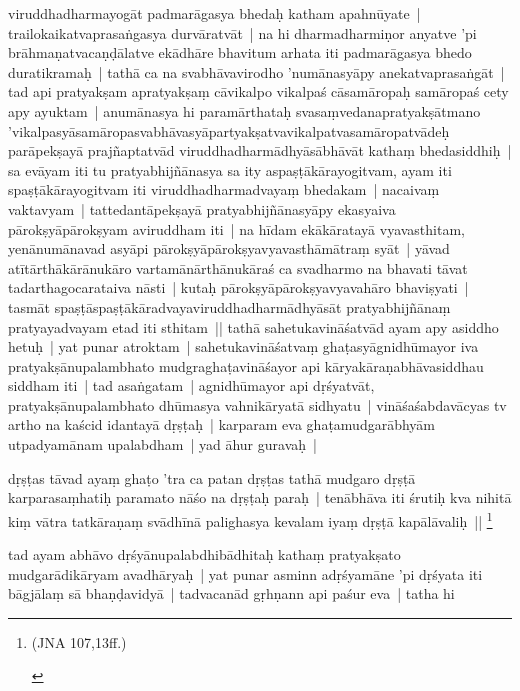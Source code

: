 \documentclass[article,a4paper]{memoir}
\begin{document}
viruddhadharmayogā\-t padmarā\-gasya bhedaḥ katham apahnū\-yate | trailokaikatvaprasaṅgasya durvā\-ratvā\-t | na hi dharmadharmiṇor anyatve 'pi brā\-hmaṇatvacaṇḍā\-latve ekā\-dhā\-re bhavitum arhata iti padmarā\-gasya bhedo duratikramaḥ | \label{thakur75-118.7} tathā\- ca na svabhā\-vavirodho 'numā\-nasyā\-py anekatvaprasaṅgā\-t | tad api pratyakṣam apratyakṣaṃ cā\-vikalpo vikalpaś cā\-samā\-ropaḥ samā\-ropaś cety apy ayuktam | anumā\-nasya hi paramā\-rthataḥ svasaṃvedanapratyakṣā\-tmano 'vikalpasyā\-samā\-ropasvabhā\-vasyā\-partyakṣatvavikalpatvasamā\-ropatvā\-deḥ parā\-pekṣayā\- prajñaptatvā\-d viruddhadharmā\-dhyā\-sā\-bhā\-vā\-t kathaṃ bhedasiddhiḥ | sa evā\-yam iti tu pratyabhijñā\-nasya sa ity aspaṣṭā\-kā\-rayogitvam, ayam iti spaṣṭā\-kā\-rayogitvam iti viruddhadharmadvayaṃ bhedakam | \label{thakur75-118.13} nacaivaṃ vaktavyam | tattedantā\-pekṣayā\- pratyabhijñā\-nasyā\-py ekasyaiva pā\-rokṣyā\-pā\-rokṣyam aviruddham iti | na hī\-dam ekā\-kā\-ratayā\- vyavasthitam, yenā\-numā\-navad asyā\-pi pā\-rokṣyā\-pā\-rokṣyavyavasthā\-mā\-traṃ syā\-t | yā\-vad atī\-tā\-rthā\-kā\-rā\-nukā\-ro vartamā\-nā\-rthā\-nukā\-raś ca svadharmo na bhavati tā\-vat tadarthagocarataiva nā\-sti | kutaḥ pā\-rokṣyā\-pā\-rokṣyavyavahā\-ro bhaviṣyati | tasmā\-t spaṣṭā\-spaṣṭā\-kā\-radvayaviruddhadharmā\-dhyā\-sā\-t pratyabhijñā\-naṃ pratyayadvayam etad iti sthitam || \label{thakur75-118.19} tathā\- sahetukavinā\-śatvā\-d ayam apy asiddho hetuḥ | yat punar atroktam | sahetukavinā\-śatvaṃ ghaṭasyā\-gnidhū\-mayor iva pratyakṣā\-nupalambhato mudgraghaṭavinā\-śayor api kā\-ryakā\-raṇabhā\-vasiddhau siddham iti | tad asaṅgatam | agnidhū\-mayor api dṛśyatvā\-t, pratyakṣā\-nupalambhato dhū\-masya vahnikā\-ryatā\- sidhyatu | vinā\-śaśabdavā\-cyas tv artho na kaścid idantayā\- dṛṣṭaḥ | karparam eva ghaṭamudgarā\-bhyā\-m utpadyamā\-nam upalabdham | \label{thakur75-118.23} yad ā\-hur guravaḥ |
	\pend
      

	  \pstart dṛṣṭas tā\-vad ayaṃ ghaṭo 'tra ca patan dṛṣṭas tathā\- mudgaro dṛṣṭā\- karparasaṃhatiḥ paramato nā\-śo na dṛṣṭaḥ paraḥ | tenā\-bhā\-va iti śrutiḥ kva nihitā\- kiṃ vā\-tra tatkā\-raṇaṃ svā\-dhī\-nā\- palighasya kevalam iyaṃ dṛṣṭā\- kapā\-lā\-valiḥ || \footnote{\begin{english}(JNA 107,13ff.)\end{english}}
	\pend
      

	  \pstart tad ayam abhā\-vo dṛśyā\-nupalabdhibā\-dhitaḥ kathaṃ pratyakṣato mudgarā\-dikā\-ryam avadhā\-ryaḥ | \label{thakur75-118.29} yat punar asminn adṛśyamā\-ne 'pi dṛśyata iti bā\-gjā\-laṃ sā\- bhaṇḍavidyā\- | tadvacanā\-d gṛhṇann api paśur eva | tatha hi
	\pend
      
\end{document}

